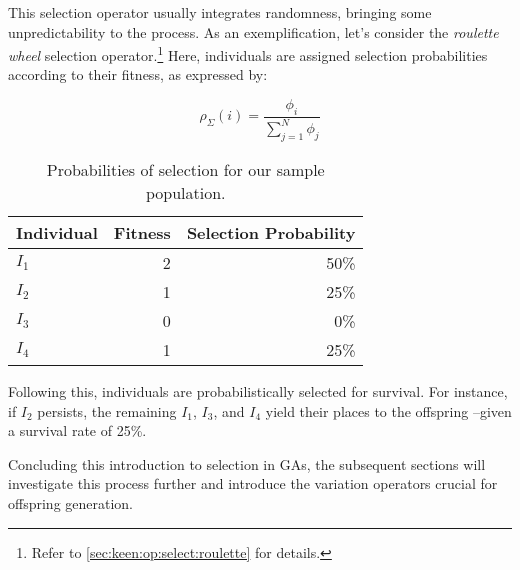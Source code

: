   This selection operator usually integrates randomness, bringing some unpredictability to the process.
  As an exemplification, let's consider the \textit{roulette wheel} selection operator.\footnote{
    Refer to \vref{sec:keen:op:select:roulette} for details.
  } Here, individuals are assigned selection probabilities according to their fitness, as expressed by:

  \begin{equation}
    \label{eq:selection_probability}
    \rho_\Sigma(i) = \frac{\phi_i}{\sum_{j=1}^{N}\phi_j}
  \end{equation}

  \begin{table}[ht!]
    \centering
    \begin{tabular}{|l|r|r|}
      \hline
      Individual & Fitness & Selection Probability \\
      \hline
      \(I_1\)    & 2       & 50\% \\
      \(I_2\)    & 1       & 25\% \\
      \(I_3\)    & 0       & 0\%  \\
      \(I_4\)    & 1       & 25\% \\
      \hline
    \end{tabular}
    \caption{Probabilities of selection for our sample population.}
    \label{tab:selection_probabilities}
  \end{table}

  Following this, individuals are probabilistically selected for survival.
  For instance, if \(I_2\) persists, the remaining \(I_1\), \(I_3\), and \(I_4\) 
  yield their places to the offspring --given a survival rate of 25\%.

  Concluding this introduction to selection in GAs, the subsequent sections will 
  investigate this process further and introduce the variation operators crucial 
  for offspring generation.
  